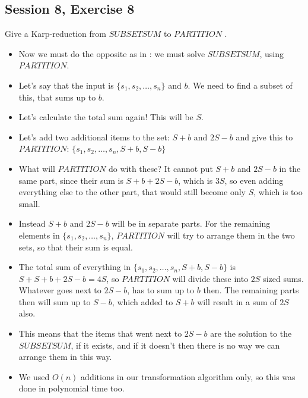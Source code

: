 \subsection {Session 8, Exercise 8}
\label{8_8}



Give a Karp-reduction from $SUBSETSUM$ to $PARTITION$ .


\begin{itemize}
    \item Now we must do the opposite as in : we must solve $SUBSETSUM$, using $PARTITION$.
    \item Let's say that the input is $\{s_1, s_2, \dots{}, s_n\}$ and $b$. We need to find a subset of this, that sums up to $b$.
    \item Let's calculate the total sum again! This will be $S$.
    \item Let's add two additional items to the set: $S+b$ and $2S-b$ and give this to $PARTITION$: $\{s_1, s_2, \dots{}, s_n, S+b, S-b\}$
    \item What will $PARTITION$ do with these? It cannot put $S+b$ and $2S-b$ in the same part, since their sum is $S+b+2S-b$, which is $3S$, so even adding everything else to the other part, that would still become only $S$, which is too small.
    \item Instead $S+b$ and $2S-b$ will be in separate parts. For the remaining elements in $\{s_1, s_2, \dots{}, s_n\}$, $PARTITION$ will try to arrange them in the two sets, so that their sum is equal.
    \item The total sum of everything in $\{s_1, s_2, \dots{}, s_n, S+b, S-b\}$ is $S + S + b + 2S - b = 4S$, so $PARTITION$ will divide these into $2S$ sized sums. Whatever goes next to $2S-b$, has to sum up to $b$ then. The remaining parts then will sum up to $S-b$, which added to $S+b$ will result in a sum of $2S$ also.
    \item This means that the items that went next to $2S-b$ are the solution to the $SUBSETSUM$, if it exists, and if it doesn't then there is no way we can arrange them in this way.
    \item We used $O(n)$ additions in our transformation algorithm only, so this was done in polynomial time too.
\end{itemize}


